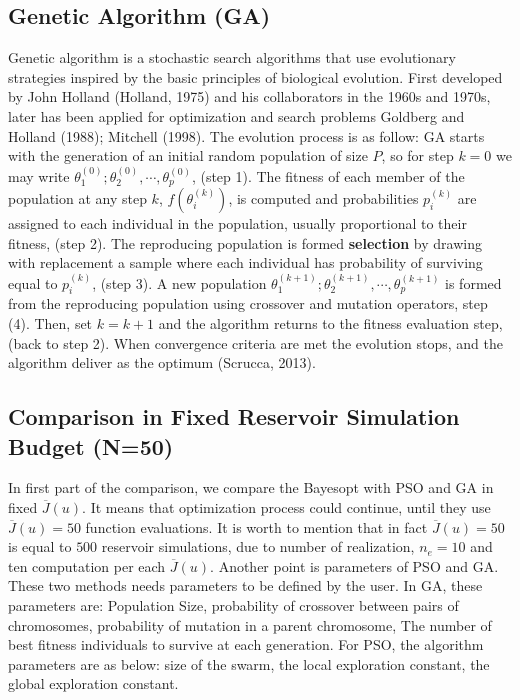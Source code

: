 \documentclass[]{elsarticle} %
\begin{document}
\hypertarget{genetic-algorithm-ga}{%
\subsection{Genetic Algorithm (GA)}\label{genetic-algorithm-ga}}

Genetic algorithm is a stochastic search algorithms that use evolutionary strategies inspired by the basic principles of biological evolution. First developed by John Holland (Holland, 1975) and his collaborators in the 1960s and 1970s, later has been applied for optimization and search problems Goldberg and Holland (1988); Mitchell (1998). The evolution process is as follow: GA starts with the generation of an initial random population of size \(P\), so for step \(k = 0\) we may write \({\theta_1^{(0)}; \theta_2^{(0)},\cdots, \theta_p^{(0)}}\), (step 1). The fitness of each member of the population at any step \(k\), \(f(\theta_i^{(k)})\), is computed and probabilities \(p_i^{(k)}\) are assigned to each individual in the population, usually proportional to their fitness, (step 2). The reproducing population is formed \textbf{selection} by drawing with replacement a sample where each individual has probability of surviving equal to \(p_i^{(k)}\), (step 3). A new population \({\theta_1^{(k+1)}; \theta_2^{(k+1)},\cdots, \theta_p^{(k+1)}}\) is formed from the reproducing population using crossover and mutation operators, step (4). Then, set \(k = k + 1\) and the algorithm returns to the fitness evaluation step, (back to step 2). When convergence criteria are met the evolution stops, and the algorithm deliver as the optimum (Scrucca, 2013).

\hypertarget{comparison-in-fixed-reservoir-simulation-budget-n50}{%
\subsection{Comparison in Fixed Reservoir Simulation Budget (N=50)}\label{comparison-in-fixed-reservoir-simulation-budget-n50}}

In first part of the comparison, we compare the Bayesopt with PSO and GA in fixed \(\overline{J}(u)\). It means that optimization process could continue, until they use \(\overline{J}(u)=50\) function evaluations. It is worth to mention that in fact \(\overline{J}(u)=50\) is equal to \(500\) reservoir simulations, due to number of realization, \(n_e=10\) and ten computation per each \(\overline{J}(u)\). Another point is parameters of PSO and GA. These two methods needs parameters to be defined by the user. In GA, these parameters are: Population Size, probability of crossover between pairs of chromosomes, probability of mutation in a parent chromosome, The number of best fitness individuals to survive at each generation. For PSO, the algorithm parameters are as below: size of the swarm, the local exploration constant, the global exploration constant.
\end{document}
